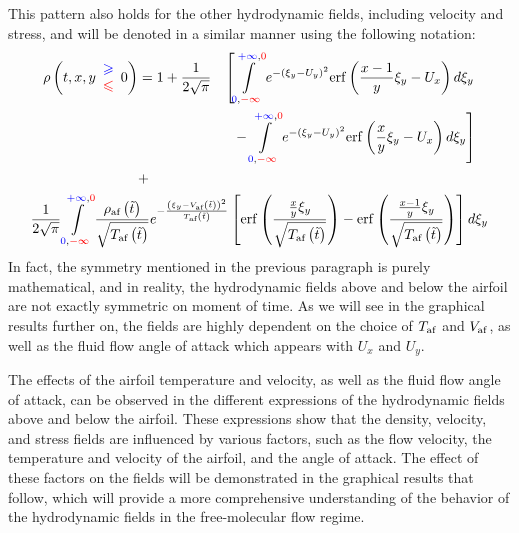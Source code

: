 This pattern also holds for the other hydrodynamic fields, including velocity and stress, and will be denoted in a similar manner using the following notation:
\begin{gather}\label{eq:density_free}
\begin{aligned}
\rho \left( t,x,y\begin{array}{ c }
\textcolor[rgb]{0,0,1}{\geqslant }\\
\textcolor[rgb]{1,0,0}{\leqslant }
\end{array} 0\right) & =1+\frac{1}{2\sqrt{\pi }} & \left[\int\limits _{\textcolor[rgb]{0,0,1}{0} ,\textcolor[rgb]{1,0,0}{-\infty }}^{\textcolor[rgb]{0,0,1}{+\infty } ,\textcolor[rgb]{1,0,0}{0}} e^{-( \xi _{y} -U_{y})^{2}}\mathrm{erf}\left(\frac{x-1}{y} \xi _{y} -U_{x}\right) d\xi _{y}\right. \\
 &  & -\left. \int\limits _{\textcolor[rgb]{0,0,1}{0} ,\textcolor[rgb]{1,0,0}{-\infty }}^{\textcolor[rgb]{0,0,1}{+\infty } ,\textcolor[rgb]{1,0,0}{0}} e^{-( \xi _{y} -U_{y})^{2}}\mathrm{erf}\left(\frac{x}{y} \xi _{y} -U_{x}\right) d\xi _{y}\right]\\
 & + & 
\end{aligned}\\
\frac{1}{2\sqrt{\pi }}\int\limits _{\textcolor[rgb]{0,0,1}{0} ,\textcolor[rgb]{1,0,0}{-\infty }}^{\textcolor[rgb]{0,0,1}{+\infty } ,\textcolor[rgb]{1,0,0}{0}}\frac{\rho _{\text{af}}\left(\tilde{t}\right)}{\sqrt{T_{\text{af}}\left(\tilde{t}\right)}} e^{-\frac{\left( \xi _{y} -V_{\text{af}}\left(\tilde{t}\right)\right)^{2}}{T_{\text{af}}\left(\tilde{t}\right)}}\left[\mathrm{erf}\left(\frac{\frac{x}{y} \xi _{y}}{\sqrt{T_{\text{af}}\left(\tilde{t}\right)}}\right) -\mathrm{erf}\left(\frac{\frac{x-1}{y} \xi _{y}}{\sqrt{T_{\text{af}}\left(\tilde{t}\right)}}\right)\right] d\xi _{y}
\label{eq:density_hitted}
\end{gather}
In fact, the symmetry mentioned in the previous paragraph is purely mathematical, and in reality, the hydrodynamic fields above and below the airfoil are not exactly symmetric on moment of time. As we will see in the graphical results further on, the fields are highly dependent on the choice of $T_{\mathrm{af}}$ and $V_{\mathrm{af}}$, as well as the fluid flow angle of attack which appears with $U_x$ and $U_y$.

The effects of the airfoil temperature and velocity, as well as the fluid flow angle of attack, can be observed in the different expressions of the hydrodynamic fields above and below the airfoil. These expressions show that the density, velocity, and stress fields are influenced by various factors, such as the flow velocity, the temperature and velocity of the airfoil, and the angle of attack. The effect of these factors on the fields will be demonstrated in the graphical results that follow, which will provide a more comprehensive understanding of the behavior of the hydrodynamic fields in the free-molecular flow regime.

